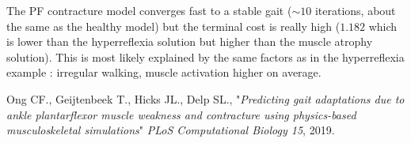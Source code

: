 \documentclass[11pt]{article}
\begin{document}
The PF contracture model converges fast to a stable gait ($\sim 10$ iterations, about the same as the healthy model) but the terminal cost is really high ($1.182$ which is lower than the hyperreflexia solution but higher than the muscle atrophy solution). This is most likely explained by the same factors as in the hyperreflexia example : irregular walking, muscle activation higher on average.


\begin{thebibliography}{1}

     Ong CF., Geijtenbeek T., Hicks JL., Delp SL., "\textit{Predicting gait adaptations due to ankle plantarflexor muscle weakness and contracture using physics-based musculoskeletal simulations}" \emph{PLoS Computational Biology 15}, 2019.
\end{thebibliography}
\end{document}
